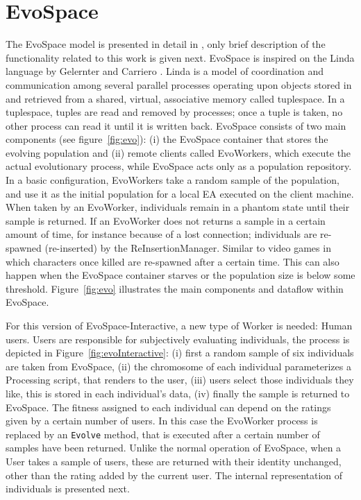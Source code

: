 \documentclass{sig-alternate}
\begin{document}
\section{EvoSpace}
The EvoSpace model is presented in detail in \cite{EvoSpace}, only brief description of the functionality related to this work is given next.  EvoSpace is inspired on the Linda language by Gelernter and Carriero \cite{linda}. Linda is a model of coordination and communication among several parallel processes operating upon objects stored in and retrieved from a shared, virtual, associative memory called tuplespace. In a tuplespace, tuples are read and removed by processes; once a tuple is taken, no other process can read it until it is written back. EvoSpace consists of two main components (see figure~\ref{fig:evo}): (i) the EvoSpace container
that stores the evolving population and (ii) remote clients called EvoWorkers, which execute the actual evolutionary process, while EvoSpace acts only as a population repository. In a basic configuration, EvoWorkers take a random sample of the population, and use it as the initial population for a local EA executed on the client machine. When taken by an EvoWorker, individuals  remain in a phantom state until their sample is returned. If an EvoWorker does not returns a sample in a certain amount of time, for instance because of a lost connection; individuals are re-spawned (re-inserted) by the ReInsertionManager. Similar to video games in which characters once killed are re-spawned after a certain time. This can also happen when the EvoSpace container starves or the population size is below some threshold. Figure~\ref{fig:evo} illustrates the main components and dataflow within EvoSpace.

For this version of EvoSpace-Interactive, a new type of Worker is needed: Human users. Users are responsible for subjectively evaluating individuals, the process is depicted in Figure~\ref{fig:evoInteractive}: (i) first a random sample of six individuals are taken from EvoSpace, (ii) the chromosome of each individual parameterizes a Processing script, that renders to the user, (iii) users select those individuals they like, this is stored in each individual's data, (iv) finally the sample is returned to EvoSpace. The fitness assigned to each individual can depend on the ratings given by a certain number of users. In this case the EvoWorker process is replaced  by an \texttt{Evolve} method, that is executed after a certain number of samples have been returned. 
Unlike the normal operation of EvoSpace, when a User takes a sample of users, these are returned with their identity unchanged, other than the rating added by the current user. The internal representation of individuals is presented next.
\end{document}
